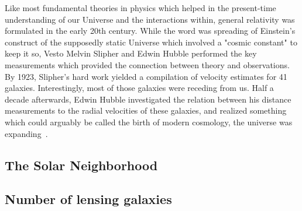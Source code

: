 

Like most fundamental theories in physics which helped in the present-time
understanding of our Universe and the interactions within, general relativity
was formulated in the early 20th century.  While the word was spreading of
Einstein's construct of the supposedly static Universe which involved a "cosmic
constant" to keep it so, Vesto Melvin Slipher and Edwin Hubble performed the key
measurements which provided the connection between theory and observations. By
1923, Slipher's hard work yielded a compilation of velocity estimates for 41
galaxies. Interestingly, most of those galaxies were receding from us.  Half a
decade afterwards, Edwin Hubble investigated the relation between his distance
measurements to the radial velocities of these galaxies, and realized something
which could arguably be called the birth of modern cosmology, the universe was
expanding~.


\subsection{The Solar Neighborhood}



\subsection{Number of lensing galaxies}
